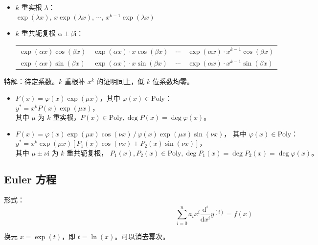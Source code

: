 \documentclass[12pt, a4paper, UTF8, openany]{ctexbook}
\newcommand{\dif}{\mathrm{d}}
\newcommand{\imunit}{\mathrm{i}}%
\begin{document}
        \begin{itemize}
            \item $k$ 重实根 $\lambda$：\\
                $\exp(\lambda x), \, x\exp(\lambda x), \, \cdots, \, x^{k - 1}\exp(\lambda x)$
            \item $k$ 重共轭复根 $\alpha \pm \beta\imunit$：
                \begin{longtable}[h]{*{2}{w{c}{4cm}} w{c}{0.5cm} w{c}{4cm}}
                    $\exp(\alpha x)\cos(\beta x)$ & $\exp(\alpha x)\cdot x\cos(\beta x)$ 
                    & $\cdots$ & $\exp(\alpha x)\cdot x^{k - 1}\cos(\beta x)$ \\
                    $\exp(\alpha x)\sin(\beta x)$ & $\exp(\alpha x)\cdot x\sin(\beta x)$ 
                    & $\cdots$ & $\exp(\alpha x)\cdot x^{k - 1}\sin(\beta x)$
                \end{longtable}
        \end{itemize}

        特解：待定系数。$k$ 重根补 $x^k$ 的证明同上，低 $k$ 位系数均零。

        \begin{itemize}
            \item $F(x) = \varphi(x)\exp(\mu x)$，其中 $\varphi(x) \in \mathrm{Poly}$：\\
                $y^\ast = x^k P(x) \exp(\mu x)$，\\
                其中 $\mu$ 为 $k$ 重实根，$P(x) \in \mathrm{Poly}, \deg P(x) = \deg\varphi(x)$。
            \item $F(x) = \varphi(x)\exp(\mu x)\cos(\nu x) \, / \, \varphi(x)\exp(\mu x)\sin(\nu x)$，
                其中 $\varphi(x) \in \mathrm{Poly}$：\\
                $y^\ast = x^k\exp(\mu x)[P_1(x)\cos(\nu x) + P_2(x)\sin(\nu x)]$，\\
                其中 $\mu \pm \nu\imunit$ 为 $k$ 重共轭复根，
                $P_1(x),P_2(x) \in \mathrm{Poly}, \deg P_1(x) = \deg P_2(x) = \deg\varphi(x)$。
        \end{itemize}

        \subsection{Euler 方程}
        形式：
        $$\sum_{i = 0}^{n} a_i x^i \frac{\dif^i}{\dif x^{i}} y^{(i)} = f(x)$$

        换元 $x = \exp(t)$，即 $t = \ln(x)$。可以消去幂次。
\end{document}
